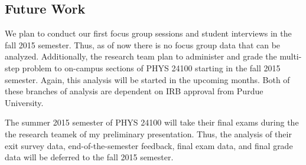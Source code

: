 \subsection{Future Work}

We plan to conduct our first focus group sessions and student interviews in the fall 2015 semester. Thus, as of now there is no focus group data that can be analyzed. Additionally, the research team plan to administer and grade the multi-step problem to on-campus sections of PHYS 24100 starting in the fall 2015 semester. Again, this analysis will be started in the upcoming months. Both of these branches of analysis are dependent on IRB approval from Purdue University.

The summer 2015 semester of PHYS 24100 will take their final exams during the the research teamek of my preliminary presentation. Thus, the analysis of their exit survey data, end-of-the-semester feedback, final exam data, and final grade data will be deferred to the fall 2015 semester.
